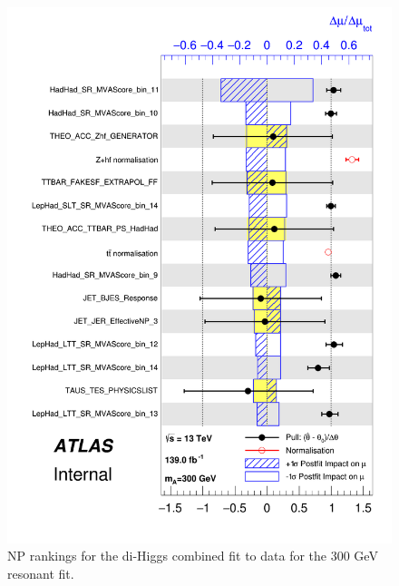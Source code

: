 \begin{figure}
\centering
\includegraphics[width=.8\textwidth]{figures/results/HH/Combined/Rankings/rank_300}
\caption{NP rankings for the di-Higgs combined fit to data for the 300 GeV resonant fit.}
\label{fig:CombinedPostfitNPRankings2HDM300}
\end{figure}

